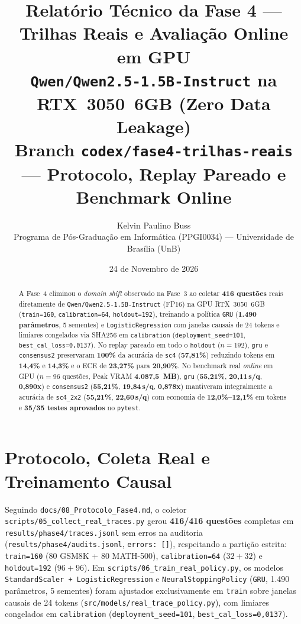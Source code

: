 \documentclass[11pt,a4paper]{article}
\title{
  \vspace{-1.0cm}
  \textcolor{unbblue}{\textbf{Relatório Técnico da Fase 4 --- Trilhas Reais e Avaliação Online em GPU}}\\
  \large \texttt{Qwen/Qwen2.5-1.5B-Instruct} na RTX~3050~6GB (Zero Data Leakage)\\
  \normalsize \textcolor{mutedgray}{Branch \texttt{codex/fase4-trilhas-reais} --- Protocolo, Replay Pareado e Benchmark Online}
}
\author{
  Kelvin Paulino Buss \\
  \small Programa de Pós-Graduação em Informática (PPGI0034) --- Universidade de Brasília (UnB)
}
\date{24 de Novembro de 2026}
\begin{document}
\maketitle
\thispagestyle{fancy}

\begin{abstract}
A Fase~4 eliminou o \emph{domain shift} observado na Fase~3 ao coletar \textbf{416 questões} reais diretamente de \texttt{Qwen/Qwen2.5-1.5B-Instruct} (FP16) na GPU RTX~3050~6GB (\texttt{train=160}, \texttt{calibration=64}, \texttt{holdout=192}), treinando a política \texttt{GRU} (\textbf{1.490 parâmetros}, 5 sementes) e \texttt{LogisticRegression} com janelas causais de 24 tokens e limiares congelados via SHA256 em \texttt{calibration} (\texttt{deployment\_seed=101}, \texttt{best\_cal\_loss=0,0137}). No replay pareado em todo o \texttt{holdout} ($n=192$), \texttt{gru} e \texttt{consensus2} preservaram \textbf{100\%} da acurácia de \texttt{sc4} (\textbf{57,81\%}) reduzindo tokens em \textbf{14,4\%} e \textbf{14,3\%} e o ECE de \textbf{23,27\%} para \textbf{20,90\%}. No benchmark real \emph{online} em GPU ($n=96$ questões, Peak VRAM \textbf{4.087,5~MB}), \texttt{gru} (\textbf{55,21\%}, \textbf{20,11\,s/q}, \textbf{0,890x}) e \texttt{consensus2} (\textbf{55,21\%}, \textbf{19,84\,s/q}, \textbf{0,878x}) mantiveram integralmente a acurácia de \texttt{sc4\_2x2} (\textbf{55,21\%}, \textbf{22,60\,s/q}) com economia de \textbf{12,0\%--12,1\%} em tokens e \textbf{35/35 testes aprovados} no \texttt{pytest}.
\end{abstract}

\section{Protocolo, Coleta Real e Treinamento Causal}
Seguindo \texttt{docs/08\_Protocolo\_Fase4.md}, o coletor \texttt{scripts/05\_collect\_real\_traces.py} gerou \textbf{416/416 questões} completas em \texttt{results/phase4/traces.jsonl} sem erros na auditoria (\texttt{results/phase4/audits.jsonl}, \texttt{errors: []}), respeitando a partição estrita: \texttt{train=160} ($80$ GSM8K + $80$ MATH-500), \texttt{calibration=64} ($32+32$) e \texttt{holdout=192} ($96+96$). Em \texttt{scripts/06\_train\_real\_policy.py}, os modelos \texttt{StandardScaler + LogisticRegression} e \texttt{NeuralStoppingPolicy} (\texttt{GRU}, 1.490 parâmetros, 5 sementes) foram ajustados exclusivamente em \texttt{train} sobre janelas causais de 24 tokens (\texttt{src/models/real\_trace\_policy.py}), com limiares congelados em \texttt{calibration} (\texttt{deployment\_seed=101}, \texttt{best\_cal\_loss=0,0137}).
\end{document}
